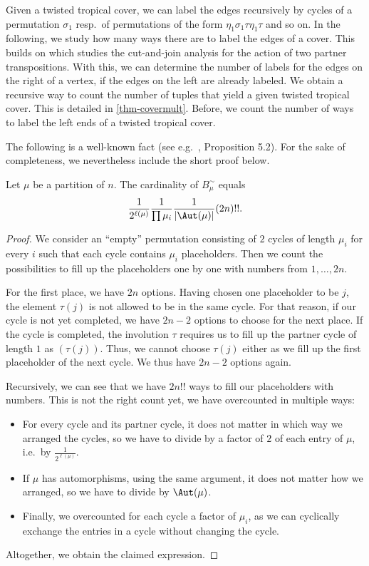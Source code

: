 \begin{rema}
    Given a twisted tropical cover, we can label the edges recursively by cycles of a permutation $\sigma_1$ resp.\ of permutations of the form $\eta_1\sigma_1\tau\eta_1\tau$ and so on. In the following, we study how many ways there are to label the edges of a cover. This builds on \cite[Theorem 2.12]{BF21} which studies the cut-and-join analysis for the action of two partner transpositions. With this, we can determine the number of labels for the edges on the right of a vertex, if the edges on the left are already labeled. We obtain a recursive way to count the number of tuples that yield a given twisted tropical cover. This is detailed in \cref{thm-covermult}. Before, we count the number of ways to label the left ends of a twisted tropical cover.
\end{rema}

The following is a well-known fact (see e.g.~\cite{goulden1996connection}, Proposition 5.2). For the sake of completeness, we nevertheless include the short proof below.
\begin{lemma}
\label{lem-conjclass}
Let $\mu$ be a partition of $n$.
The cardinality of $B^\sim_\mu$ equals
$$ \frac{1}{2^{\ell(\mu)}} \frac{1}{\prod \mu_i} \frac{1}{|\Aut(\mu)|}(2n)!! .$$
\end{lemma}

\begin{proof}
We consider an ``empty'' permutation consisting of $2$ cycles of length $\mu_i$ for every $i$ such that each cycle contains $\mu_i$ placeholders. Then we count the possibilities to fill up the placeholders one by one with numbers from $1,\ldots,2n$.

For the first place, we have $2n$ options. 
Having chosen one placeholder to be $j$, the element $\tau(j)$ is not allowed to be in the same cycle. For that reason, if our cycle is not yet completed, we have $2n-2$ options to choose for the next place. If the cycle is completed, the involution $\tau$ requires us to fill up the partner cycle of length $1$ as $(\tau(j))$. Thus, we cannot choose $\tau(j)$ either as we fill up the first placeholder of the next cycle. We thus have $2n-2$ options again.

Recursively, we can see that we have $2n!!$ ways to fill our placeholders with numbers. This is not the right count yet, we have overcounted in multiple ways:
\begin{itemize}
    \item For every cycle and its partner cycle, it does not matter in which way we arranged the cycles, so we have to divide by a factor of $2$ of each entry of $\mu$, i.e.\ by $\frac{1}{2^{\ell(\mu)}}$.
    \item If $\mu$ has automorphisms, using the same argument, it does not matter how we arranged, so we have to divide by $\Aut(\mu)$.
    \item Finally, we overcounted for each cycle a factor of $\mu_i$, as we can cyclically exchange the entries in a cycle without changing the cycle.
\end{itemize}
Altogether, we obtain the claimed expression.
\end{proof}

